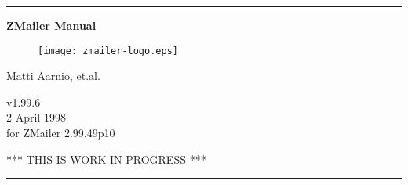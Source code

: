 \documentclass[twoside,a4paper]{article}
\begin{document}
\startdocument

\begin{titlepage}
{
\hrule
\begin{center}
\bfseries
\Huge
\vspace{2ex}
ZMailer Manual \\
\vspace{2ex}

\begin{htmlonly}
\end{htmlonly}

\begin{figure}[h]
  \texttt{[image: zmailer-logo.eps]}
\end{figure}
\vspace{2ex}

\Large
Matti Aarnio, et.al. \\
\vspace{2ex}
\begin{htmlonly}
\vspace{1ex}
\end{htmlonly}
v1.99.6 \\
2 April 1998 \\
for ZMailer 2.99.49p10 \\
\vspace{2ex}
\begin{htmlonly}
\vspace{1ex}
\end{htmlonly}
\Huge
\sffamily
*** THIS IS WORK IN PROGRESS ***
\end{center}
\vfill
\hrule
}
\end{titlepage}

\cleardoublepage


%
\end{document}
